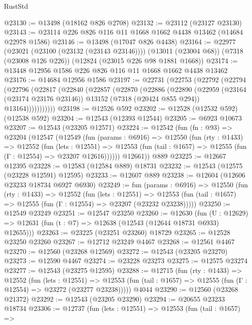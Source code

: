 \begin{lexlean}{RustStd}
\begin{coremodule}
@23130 := @13498 (@18162 @826 @2708)
@23132 := @23112 (@23127 @23130)
@23143 := @23114 @226 @826 @116 @11 @1668 @1662 @4438 @13462 (@14684 @22978 @1586)
@23146 := @13498 (@17047 @826 @4438)
@23164 := @22977
    (@23021 (@23100 (@23132 (@23143 @23146))))
    (@13011 (@23004 @68))
    (@7318 (@23008 @126 @226))
    (@12824 (@23015 @226 @98 @1881 @1668))
@23174 := @13448 @12956 @1586 @226 @826 @116 @11 @1668 @1662 @4438 @13462
@23176 := @14684 @12956 @1586
@23197 := @22731
    (@22753
      (@22792
        (@22794
          (@22796
            (@22817
              (@22840
                (@22857
                  (@22870
                    (@22886
                      (@22890
                        (@22959
                          (@23164 (@23174 @23176 @23146))
                          @13152
                          (@7318 (@20424 @855 @294))
                          @13164)))))))))))
@23198 := @12526 @592
@23202 := @12528 (@12532 @592) (@12538 @592)
@23204 := @12543 (@12393 @12544)
@23205 := @6923 @10673
@23207 := @12543 (@23205 @12571)
@23224 := @12542
    (fun (fn : @93) =>
    @23204
      (@12547
        (@12549
          (fun (params : @6916) =>
          @12550
            (fun (rty : @1433) =>
            @12552
              (fun (lets : @12551) =>
              @12553 (fun (tail : @1657) => @12555 (fun (Γ : @12554) => @23207 @12616))))))
        @12661))
    @889
@23225 := @12667 @12395
@23228 := @12583 (@12584 @889) @18731
@23232 := @12543 (@12575 (@23228 @12591) @12595)
@23233 := @12607 @889
@23238 := @12604 (@12606 @23233 @18734 @6927 @6930)
@23249 := fun (params : @6916) =>
  @12550
    (fun (rty : @1433) =>
    @12552
      (fun (lets : @12551) =>
      @12553 (fun (tail : @1657) => @12555 (fun (Γ : @12554) => @23207 (@23232 @23238)))))
@23250 := @12549 @23249
@23251 := @12547 @23250
@23260 := @12630
    (fun (U : @12629) => @12631 (fun (t : @7) => @12638 (@12543 (@12644 @18731 @6933) @12655)))
@23263 := @23225 (@23251 @23260) @18729
@23265 := @12528 @23250 @23260
@23267 := @12712 @23249 @4467
@23268 := @12561 @4467
@23270 := @12560 (@23268 @12569)
@23272 := @12543 (@23205 @23270)
@23273 := @12590 @4467
@23274 := @23228 @23273
@23275 := @12575 @23274
@23277 := @12543 (@23275 @12595)
@23288 := @12715
    (fun (rty : @1433) =>
    @12552
      (fun (lets : @12551) =>
      @12553 (fun (tail : @1657) => @12555 (fun (Γ : @12554) => @23272 (@23277 @23238)))))
    @4044
@23290 := @12560 (@23268 @21372)
@23292 := @12543 (@23205 @23290)
@23294 := @20655 @23233 @18734
@23306 := @12737
    (fun (lets : @12551) =>
    @12553
      (fun (tail : @1657) =>

\end{coremodule}
\end{lexlean}
